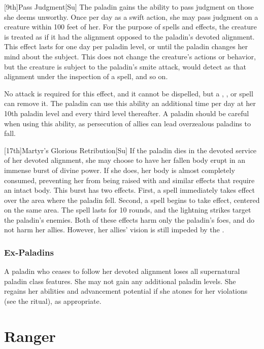 [9th]{Pass Judgment}[Su]
The paladin gains the ability to pass judgment on those she deems unworthy.
Once per day as a swift action, she may pass judgment on a creature within 100 feet of her.
For the purpose of spells and effects, the creature is treated as if it had the alignment opposed to the paladin's devoted alignment.
This effect lasts for one day per paladin level, or until the paladin changes her mind about the subject.
This does not change the creature's actions or behavior, but the creature is subject to the paladin's smite attack, would detect as that alignment under the inspection of a  spell, and so on.

No attack is required for this effect, and it cannot be dispelled, but a , , or  spell can remove it.
The paladin can use this ability an additional time per day at her 10th paladin level and every third level thereafter.
A paladin should be careful when using this ability, as persecution of allies can lead overzealous paladins to fall.

[17th]{Martyr's Glorious Retribution}[Su]
If the paladin dies in the devoted service of her devoted alignment, she may choose to have her fallen body erupt in an immense burst of divine power.
If she does, her body is almost completely consumed, preventing her from being raised with  and similar effects that require an intact body.
This burst has two effects.
First, a  spell immediately takes effect over the area where the paladin fell.
Second, a  spell begins to take effect, centered on the same area.
The spell lasts for 10 rounds, and the lightning strikes target the paladin's enemies.
Both of these effects harm only the paladin's foes, and do not harm her allies.
However, her allies' vision is still impeded by the .

\subsubsection{Ex-Paladins}
A paladin who ceases to follow her devoted alignment loses all supernatural paladin class features.
She may not gain any additional paladin levels.
She regains her abilities and advancement potential if she atones for her violations (see the  ritual), as appropriate.

\section{Ranger}

